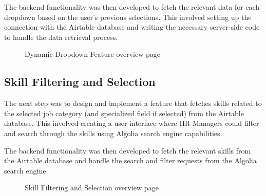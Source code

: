 The backend functionality was then developed to fetch the relevant data for each dropdown based on the user's previous selections. This involved setting up the connection with the Airtable database and writing the necessary server-side code to handle the data retrieval process.


\begin{figure}[H]
    \centering
    \caption{ Dynamic Dropdown Feature overview page}
    \label{fig:Dynamic-Dropdown-Feature-overview-page}
\end{figure}


\newpage
\subsection{Skill Filtering and Selection} 
The next step was to design and implement a feature that fetches skills related to the selected job category (and specialized field if selected) from the Airtable database. This involved creating a user interface where HR Managers could filter and search through the skills using Algolia search engine capabilities.

The backend functionality was then developed to fetch the relevant skills from the Airtable database and handle the search and filter requests from the Algolia search engine.

\begin{figure}[H]
    \centering
    \caption{ Skill Filtering and Selection overview page}
    \label{fig:Skill-Filtering-and-Selection-overview-page}
\end{figure}


